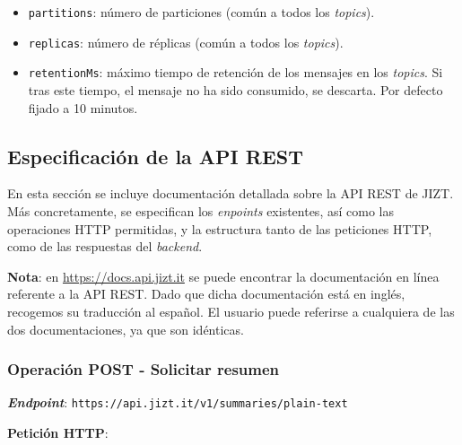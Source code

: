 \begin{itemize} [\textbullet]
	\begin{itemize} [◦]
		\item \texttt{partitions}: número de particiones (común a todos los \emph{topics}).
		\item \texttt{replicas}: número de réplicas (común a todos los \emph{topics}).
		\item \texttt{retentionMs}: máximo tiempo de retención de los mensajes en los \emph{topics}. Si tras este tiempo, el mensaje no ha sido consumido, se descarta. Por defecto fijado a 10 minutos.
	\end{itemize}
\end{itemize}

\subsection{Especificación de la API REST} \label{subsection:api-docs}

En esta sección se incluye documentación detallada sobre la API REST de JIZT. Más concretamente, se especifican los \emph{enpoints} existentes, así como las operaciones HTTP permitidas, y la estructura tanto de las peticiones HTTP, como de las respuestas del \emph{backend}.

\textbf{Nota}: en \href{https://dmlls.github.io/jizt-tfg-api-docs}{https://docs.api.jizt.it} se puede encontrar la documentación en línea referente a la API REST. Dado que dicha documentación está en inglés, recogemos su traducción al español. El usuario puede referirse a cualquiera de las dos documentaciones, ya que son idénticas.


\subsubsection{Operación POST - Solicitar resumen}

\textbf{\emph{Endpoint}}: \texttt{https://api.jizt.it/v1/summaries/plain-text}

\textbf{Petición HTTP}:


